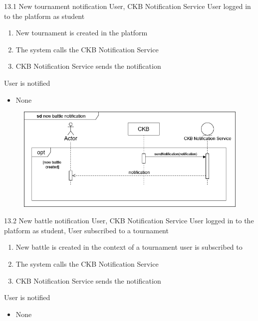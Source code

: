 {13.1}
{New tournament notification} %
{User, CKB Notification Service} %
{User logged in to the platform as student} %
{ %
    \begin{enumerate}
        \item New tournament is created in the platform
        \item The system calls the CKB Notification Service
        \item CKB Notification Service sends the notification
    \end{enumerate}
}
{User is notified} %
{ %
    \begin{itemize}
        \item None
    \end{itemize}
}
{ %

}

\usecase
{
    \begin{figure}[H]
        \centering
        \includegraphics[width=\textwidth]{src/sequence_diagrams/notifybattle.png}
    \end{figure}
}
{13.2}
{New battle notification} %
{User, CKB Notification Service} %
{User logged in to the platform as student, User subscribed to a tournament} %
{ %
    \begin{enumerate}
        \item New battle is created in the context of a tournament user is subscribed to
        \item The system calls the CKB Notification Service
        \item CKB Notification Service sends the notification
    \end{enumerate}
}
{User is notified} %
{ %
    \begin{itemize}
        \item None
    \end{itemize}
}
{ %

}

